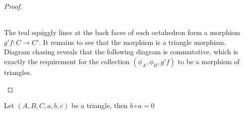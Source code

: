 \begin{proof}
\begin{minipage}[t]{0.48\textwidth}
\begin{center}
            \end{center}
        \end{minipage} \\
        The teal squiggly lines at the back faces of each octahedron form a morphism $g'f:C\rightarrow C'$. It remains to see that the morphism is a triangle morphism. Diagram chasing reveals that the following diagram is commutative, which is exactly the requirement for the collection $(\phi_A,\phi_B,g'f)$ to be a morphism of triangles.
        \begin{center}
        \end{center}
    \end{proof}

    \begin{lemma}
        Let $(A,B,C,a,b,c)$ be a triangle, then $b\circ a=0$
    \end{lemma}


